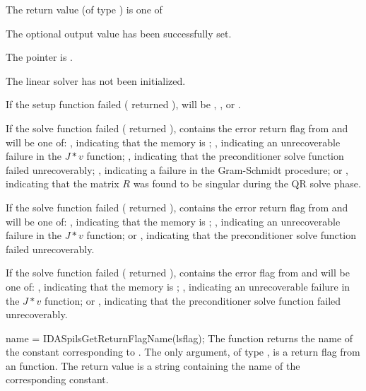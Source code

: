 {{}
{
  The return value  (of type ) is one of
  \begin{args}
  \item[\Id{IDASPILS\_SUCCESS}] 
    The optional output value has been successfully set.
  \item[\Id{IDASPILS\_MEM\_NULL}]
    The  pointer is .
  \item[\Id{IDASPILS\_LMEM\_NULL}]
    The {\idaspils} linear solver has not been initialized.
  \end{args}
}
{
  If the {\idaspils} setup function failed ( returned
  ),  will be ,
  , or .

  If the {\idaspgmr} solve function failed ( returned 
  ),  contains the error return flag from
   and will be one of:
  , indicating that the {\spgmr} memory is ;
  , indicating an unrecoverable failure in the 
  $J*v$ function;
  , indicating that the preconditioner solve
  function  failed unrecoverably;
  , indicating a failure in the Gram-Schmidt procedure;
  or , indicating that the matrix $R$ was found to 
  be singular during the QR solve phase.

  If the {\idaspbcg} solve function failed ( returned 
  ),  contains the error return flag from
   and will be one of:
  , indicating that the {\spbcg} memory is ;
  , indicating an unrecoverable failure in the 
  $J*v$ function; or
  , indicating that the preconditioner solve
  function  failed unrecoverably.

  If the {\idasptfqmr} solve function failed ( returned 
  ),  contains the error flag from
   and will be one of:
  , indicating that the {\sptfqmr} memory is ;
  , indicating an unrecoverable failure in 
  the $J*v$ function; or
  , indicating that the preconditioner solve
  function  failed unrecoverably.


}
{
  name = IDASpilsGetReturnFlagName(lsflag);
}
{
  The function  returns the
  name of the {\idaspils} constant corresponding to .
}
{
  The only argument, of type , is a return flag from an {\idaspils} function.
}
{
  The return value is a string containing the name of the corresponding constant.
}
{}

}

